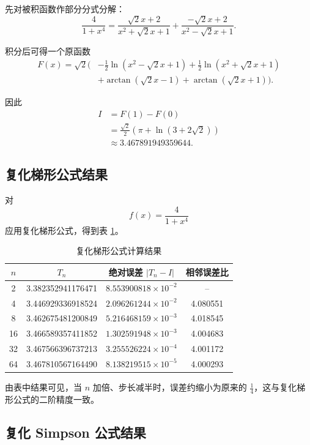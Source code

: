 \documentclass[12pt,a4paper]{ctexart}
\begin{document}
先对被积函数作部分分式分解：
\[
\frac{4}{1+x^4}
=\frac{\sqrt{2}x+2}{x^2+\sqrt{2}x+1}
+\frac{-\sqrt{2}x+2}{x^2-\sqrt{2}x+1}.
\]

积分后可得一个原函数
\[
\begin{aligned}
F(x)=\sqrt{2}\Bigg(
&-\frac{1}{2}\ln\!\left(x^2-\sqrt{2}x+1\right)
+\frac{1}{2}\ln\!\left(x^2+\sqrt{2}x+1\right)\\
&+\arctan(\sqrt{2}x-1)+\arctan(\sqrt{2}x+1)
\Bigg).
\end{aligned}
\]

因此
\[
\begin{aligned}
I&=F(1)-F(0)\\
&=\frac{\sqrt{2}}{2}\left(\pi+\ln(3+2\sqrt{2})\right)\\
&\approx 3.467891949359644.
\end{aligned}
\]

\subsection{复化梯形公式结果}

对
\[
f(x)=\frac{4}{1+x^4}
\]
应用复化梯形公式，得到表 \ref{tab:trap}。

\begin{table}[H]
    \centering
    \caption{复化梯形公式计算结果}
    \label{tab:trap}
    \begin{tabular}{cccc}
        \toprule
        $n$ & $T_n$ & 绝对误差 $|T_n-I|$ & 相邻误差比 \\
        \midrule
        2  & 3.382352941176471 & $8.553900818\times 10^{-2}$ & -- \\
        4  & 3.446929336918524 & $2.096261244\times 10^{-2}$ & 4.080551 \\
        8  & 3.462675481200849 & $5.216468159\times 10^{-3}$ & 4.018545 \\
        16 & 3.466589357411852 & $1.302591948\times 10^{-3}$ & 4.004683 \\
        32 & 3.467566396737213 & $3.255526224\times 10^{-4}$ & 4.001172 \\
        64 & 3.467810567164490 & $8.138219515\times 10^{-5}$ & 4.000293 \\
        \bottomrule
    \end{tabular}
\end{table}

由表中结果可见，当 $n$ 加倍、步长减半时，误差约缩小为原来的 $\frac{1}{4}$，这与复化梯形公式的二阶精度一致。

\subsection{复化 Simpson 公式结果}
\end{document}
